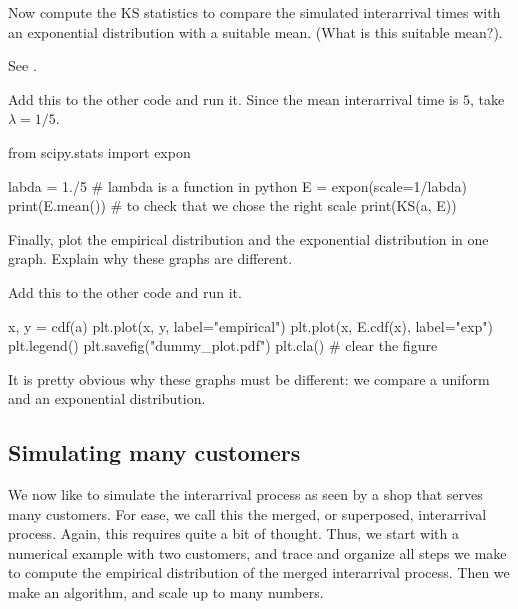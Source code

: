 \documentclass{scrartcl}
\begin{document}
\begin{exercise}
  Now compute the KS statistics to compare the simulated interarrival times with an exponential distribution with a suitable mean. (What is this suitable mean?).

See .


\begin{solution}
Add this to the other code and run it. Since the mean interarrival time is $5$, take $\lambda = 1/5$.

\begin{pyverbatim}
from scipy.stats import expon

labda = 1./5 # lambda is a function in python
E = expon(scale=1/labda) 
print(E.mean()) # to check that we chose the right scale
print(KS(a, E))    
\end{pyverbatim}
\end{solution}
\end{exercise}

\begin{exercise}
  Finally, plot the empirical distribution and the exponential distribution in one graph. Explain why these graphs are different.
\begin{solution}
Add this to the other code and run it. 
\begin{pyverbatim}
x, y = cdf(a)
plt.plot(x, y,  label="empirical")
plt.plot(x, E.cdf(x),  label="exp")
plt.legend()
plt.savefig("dummy_plot.pdf")
plt.cla() # clear the figure
\end{pyverbatim}

It is pretty obvious why these graphs must be different: we compare a uniform and an exponential distribution. 
\end{solution}
\end{exercise}


\subsection{Simulating many customers}
\label{sec:simul-many-cust}

We now like to simulate the interarrival process as seen by a shop that serves many customers. For ease, we call this the merged, or superposed, interarrival process. Again, this requires quite a bit of thought. Thus, we start with a numerical example with two customers, and trace and organize all steps we make to compute the empirical distribution of the merged interarrival process. Then we make an algorithm, and scale up to many numbers. 
\end{document}
